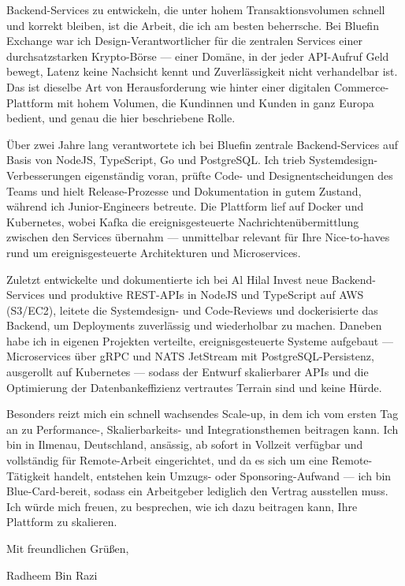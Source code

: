 \documentclass[11pt,a4paper]{coverletter}
\begin{document}
Backend-Services zu entwickeln, die unter hohem Transaktionsvolumen schnell und korrekt bleiben, ist die Arbeit, die ich am besten beherrsche. Bei Bluefin Exchange war ich Design-Verantwortlicher für die zentralen Services einer durchsatzstarken Krypto-Börse — einer Domäne, in der jeder API-Aufruf Geld bewegt, Latenz keine Nachsicht kennt und Zuverlässigkeit nicht verhandelbar ist. Das ist dieselbe Art von Herausforderung wie hinter einer digitalen Commerce-Plattform mit hohem Volumen, die Kundinnen und Kunden in ganz Europa bedient, und genau die hier beschriebene Rolle.

Über zwei Jahre lang verantwortete ich bei Bluefin zentrale Backend-Services auf Basis von NodeJS, TypeScript, Go und PostgreSQL. Ich trieb Systemdesign-Verbesserungen eigenständig voran, prüfte Code- und Designentscheidungen des Teams und hielt Release-Prozesse und Dokumentation in gutem Zustand, während ich Junior-Engineers betreute. Die Plattform lief auf Docker und Kubernetes, wobei Kafka die ereignisgesteuerte Nachrichtenübermittlung zwischen den Services übernahm — unmittelbar relevant für Ihre Nice-to-haves rund um ereignisgesteuerte Architekturen und Microservices.

Zuletzt entwickelte und dokumentierte ich bei Al Hilal Invest neue Backend-Services und produktive REST-APIs in NodeJS und TypeScript auf AWS (S3/EC2), leitete die Systemdesign- und Code-Reviews und dockerisierte das Backend, um Deployments zuverlässig und wiederholbar zu machen. Daneben habe ich in eigenen Projekten verteilte, ereignisgesteuerte Systeme aufgebaut — Microservices über gRPC und NATS JetStream mit PostgreSQL-Persistenz, ausgerollt auf Kubernetes — sodass der Entwurf skalierbarer APIs und die Optimierung der Datenbankeffizienz vertrautes Terrain sind und keine Hürde.

Besonders reizt mich ein schnell wachsendes Scale-up, in dem ich vom ersten Tag an zu Performance-, Skalierbarkeits- und Integrationsthemen beitragen kann. Ich bin in Ilmenau, Deutschland, ansässig, ab sofort in Vollzeit verfügbar und vollständig für Remote-Arbeit eingerichtet, und da es sich um eine Remote-Tätigkeit handelt, entstehen kein Umzugs- oder Sponsoring-Aufwand — ich bin Blue-Card-bereit, sodass ein Arbeitgeber lediglich den Vertrag ausstellen muss. Ich würde mich freuen, zu besprechen, wie ich dazu beitragen kann, Ihre Plattform zu skalieren.

\closing{Mit freundlichen Grüßen,}{Radheem Bin Razi}
\end{document}
